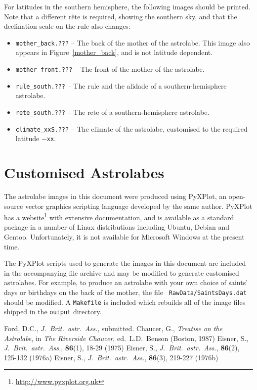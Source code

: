 \documentclass[a4paper,onecolumn,10pt]{article}
\begin{document}
For latitudes in the southern hemisphere, the following images should be
printed. Note that a different r\^ete is required, showing the southern sky,
and that the declination scale on the rule also changes:
\begin{itemize}
\item {\tt mother\_back.???} -- The back of the mother of the astrolabe. This image also appears in Figure~\ref{mother_back}, and is not latitude dependent.
\item {\tt mother\_front.???} -- The front of the mother of the astrolabe.
\item {\tt rule\_south.???} -- The rule and the alidade of a southern-hemisphere astrolabe.
\item {\tt rete\_south.???} -- The rete of a southern-hemisphere astrolabe.
\item{\tt climate\_xxS.???} -- The climate of the astrolabe, customised to the required latitude $-${\tt xx}.
\end{itemize}

\section*{Customised Astrolabes}

The astrolabe images in this document were produced using PyXPlot, an
open-source vector graphics scripting language developed by the same author.
PyXPlot has a website\footnote{\url{http://www.pyxplot.org.uk}} with extensive
documentation, and is available as a standard package in a number of Linux
distributions including Ubuntu, Debian and Gentoo. Unfortunately, it is not
available for Microsoft Windows at the present time.

The PyXPlot scripts used to generate the images in this document are included
in the accompanying file archive and may be modified to generate customised
astrolabes. For example, to produce an astrolabe with your own choice of
saints' days or birthdays on the back of the mother, the file {\tt
RawData/SaintsDays.dat} should be modified. A {\tt Makefile} is included which
rebuilds all of the image files shipped in the {\tt output} directory.

\begin{thebibliography}{9}
Ford, D.C., \textit{J.\ Brit.\ astr.\ Ass.}, submitted.
Chaucer, G., \textit{Treatise on the Astrolabe}, in {\it The Riverside Chaucer}, ed.\ L.D.\ Benson (Boston, 1987)
Eisner, S., \textit{J.\ Brit.\ astr.\ Ass.}, \textbf{86}(1), 18-29 (1975)
Eisner, S., \textit{J.\ Brit.\ astr.\ Ass.}, \textbf{86}(2), 125-132 (1976a)
Eisner, S., \textit{J.\ Brit.\ astr.\ Ass.}, \textbf{86}(3), 219-227 (1976b)
\end{thebibliography}
\end{document}
